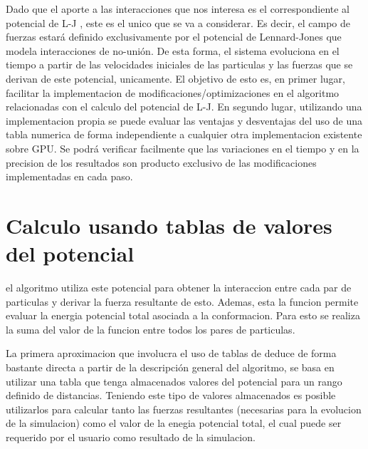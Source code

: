 \documentclass[a4paper,10pt]{report}
\begin{document}
Dado que el aporte a las interacciones que nos interesa es el correspondiente al potencial de L-J , este es el unico que se va a considerar. 
Es decir, el campo de fuerzas estará definido exclusivamente por el potencial de Lennard-Jones que modela interacciones de no-unión. 
De esta forma, el sistema evoluciona en el tiempo a partir de las velocidades iniciales de las particulas y las fuerzas que se derivan de este potencial, unicamente. 
El objetivo de esto es, en primer lugar, facilitar la implementacion de modificaciones/optimizaciones en el algoritmo relacionadas con el calculo del potencial de L-J.
En segundo lugar, utilizando una implementacion propia se puede evaluar las ventajas y desventajas del uso de una tabla numerica de forma independiente a cualquier otra implementacion existente sobre GPU. 
Se podrá verificar facilmente que las variaciones en el tiempo y en la precision de los resultados son producto exclusivo de las modificaciones implementadas en cada paso.







\section{Calculo usando tablas de valores del potencial }

el algoritmo utiliza este potencial para obtener la interaccion entre cada par de particulas y derivar la fuerza resultante de esto. 
Ademas, esta la funcion permite evaluar la energia potencial total asociada a la conformacion. Para esto se realiza la suma del valor de la funcion entre todos los pares de particulas.

La primera aproximacion que involucra el uso de tablas de deduce de forma bastante directa a partir de la descripción general del algoritmo, se basa en utilizar una tabla que tenga almacenados valores del potencial para un rango definido de distancias.
Teniendo este tipo de valores almacenados es posible utilizarlos para calcular tanto las fuerzas resultantes (necesarias para la evolucion de la simulacion) como el valor de la enegia potencial total, el cual puede ser requerido por el usuario como resultado de la simulacion.
\end{document}
